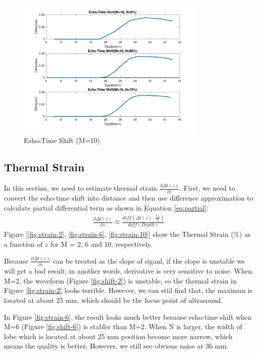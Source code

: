\documentclass{article}
\begin{document}
\begin{figure}[H]
    \centering
    \includegraphics[width=0.82\textwidth]{src/shift_10.pdf}
    \caption{Echo-Time Shift (M=10)}
    \label{fig:shift-10}
\end{figure}

\subsection{Thermal Strain}
In this section, we need to estimate thermal strain $\frac{\partial \Delta t(z)}{\partial z}$. First, we need to convert the 
echo-time shift into distance and then use difference approximation to calculate partial differential term as shown in 
Equation \ref{eq:partial}:
\begin{align}
    \frac{\partial \Delta t(z)}{\partial z} \approx \frac{diff(\Delta t(z) \cdot \frac{C_0}{2})}{diff(Depth)}
    \label{eq:partial}
\end{align}
Figure [\ref{fig:strain-2}, \ref{fig:strain-6}, \ref{fig:strain-10}] show the Thermal Strain (\%) as a function of $z$ 
for M = 2, 6 and 10, respectively.


Because $\frac{\partial \Delta t(z)}{\partial z}$ can be treated as the slope of siganl, if the slope is unstable we will
get a bad result; in another words, derivative is very sensitive to noise. When M=2, the waveform (Figure \ref{fig:shift-2})
is unstable, so the thermal strain in Figure \ref{fig:strain-2} looks terrible. However, we can stiil find that, the maximun is
located at about 25 mm, which should be the focus point of ultrasound.

In Figure \ref{fig:strain-6}, the result looks much better because echo-time shift when M=6 (Figure \ref{fig:shift-6}) is stabler
than M=2. When N is larger, the width of lobe which is located at about 25 mm position become more narrow, which means the 
quality is better. However, we still see obvious noise at 36 mm.
\end{document}
